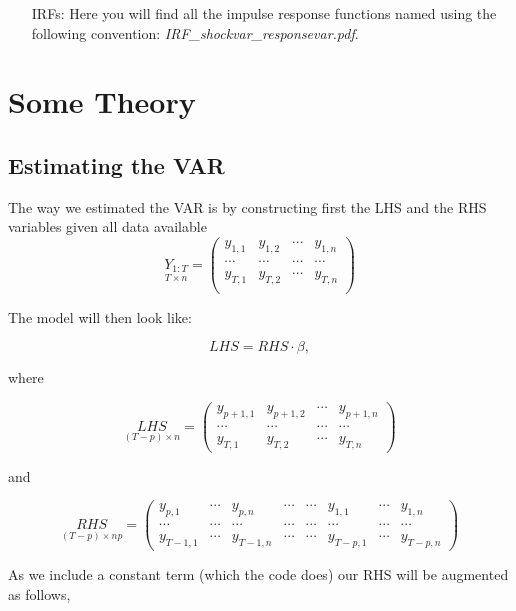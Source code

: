\documentclass[11pt]{article}
\begin{document}
\begin{itemize}
  \item[IRFs:] Here you will find all the impulse response functions named using the following convention: \textit{IRF\_shockvar\_responsevar.pdf}.
\end{itemize}


\clearpage

\section{Some Theory}

\subsection{Estimating the VAR}

The way we estimated the VAR is by constructing first the LHS and the RHS variables given all data available $$\underset{T\times n}{Y_{1:T}} = \begin{pmatrix}
y_{1,1} & y_{1,2} & \cdots & y_{1,n}\\
\cdots & \cdots & \cdots & \cdots\\
y_{T,1} & y_{T,2} & \cdots & y_{T,n}\\
\end{pmatrix}$$

The model will then look like:

$$LHS = RHS\cdot \beta,$$

where

$$\underset{(T-p)\times n}{LHS} = \begin{pmatrix}
y_{p+1,1} & y_{p+1,2} & \cdots & y_{p+1,n}\\
\cdots & \cdots & \cdots & \cdots\\
y_{T,1} & y_{T,2} & \cdots & y_{T,n}
\end{pmatrix}$$

and 

$$\underset{(T-p)\times np}{RHS} = \begin{pmatrix}
y_{p,1} &  \cdots & y_{p,n} &  \cdots &  \cdots &  y_{1,1}  & \cdots & y_{1,n}\\
\cdots &  \cdots & \cdots & \cdots &  \cdots &  \cdots & \cdots & \cdots \\
y_{T-1,1} &  \cdots & y_{T-1,n} &  \cdots  &  \cdots  & y_{T-p,1} & \cdots & y_{T-p,n}
\end{pmatrix}$$


As we include a constant term (which the code does) our RHS will be augmented as follows,
\end{document}
